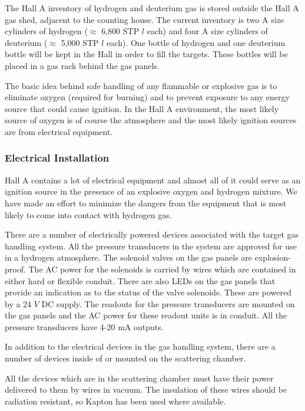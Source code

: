 {The Hall A inventory of hydrogen and deuterium gas is stored
outside the Hall A gas shed, adjacent to the counting house.
The current inventory is two A size cylinders of hydrogen
($\approx$ 6,800 STP $l$ each) and four A size cylinders
of deuterium ($\approx$ 5,000 STP $l$ each). 
One bottle of hydrogen and one deuterium bottle will be kept in the Hall
in order to fill the targets. These bottles will be placed in a gas rack behind
the gas panels. 

The basic idea behind safe handling of any flammable or explosive gas
is to eliminate oxygen (required for burning)
and to prevent exposure to any energy source that could cause ignition.
In the Hall A environment, the most likely source of oxygen is of course the
atmosphere and the most likely ignition sources are from electrical equipment.

\subsubsection{ Electrical Installation}

Hall A contains a lot of electrical equipment and almost all of it
could serve as an ignition source in the presence of an explosive
oxygen and hydrogen mixture. We have made an effort to minimize the dangers
from the equipment that is most likely to come into contact with
hydrogen gas.

There are a number of electrically powered devices associated with the
target gas handling system.
All the pressure transducers in the system are approved
for use in a hydrogen atmosphere. 
The solenoid valves on the gas panels are explosion-proof.
The AC power for the solenoids is
carried by wires which are contained in either hard or flexible conduit.
There are also LEDs on the gas panels that provide an indication as to the
status of the valve solenoids. These are powered by a 24 $V$ DC supply.
The readouts for the pressure transducers are
mounted on the gas panels and the AC power for these readout units
is in conduit. All the pressure transducers have 4-20 mA outputs.

In addition to the electrical devices in the gas handling system,
there are a number of devices inside of or mounted on the scattering
chamber.

All the devices which are in the scattering chamber must have
their power delivered to them by wires in vacuum. The
insulation of these wires should be radiation resistant, so Kapton
has been used where available.

}
